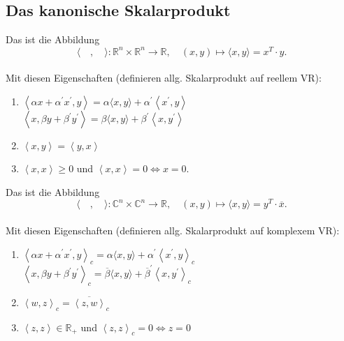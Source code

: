 \documentclass[8pt, a4paper, twocolumn, landscape]{article}
\begin{document}
\subsection{Das kanonische Skalarprodukt}
\begin{definition}
Das  ist die Abbildung $$\langle\quad, \quad\rangle: \mathbb{R}^{n} \times \mathbb{R}^{n} \rightarrow \mathbb{R}, \quad(x, y) \mapsto\langle x, y\rangle  =  x^T \cdot y.$$
\\Mit diesen Eigenschaften (definieren allg. Skalarprodukt auf reellem VR):
\begin{enumerate}
\item {} $\left\langle \alpha x+ \alpha^{\prime} x^{\prime}, y\right\rangle=\alpha \langle x, y\rangle+ \alpha^{\prime}\left\langle x^{\prime}, y\right\rangle $
\\$\left\langle x, \beta y+ \beta^{\prime} y^{\prime}\right\rangle=\beta \langle x, y\rangle+ \beta^{\prime}\left\langle x, y^{\prime}\right\rangle $
\item {} $\left\langle x, y \right\rangle = \left\langle y, x \right\rangle$
\item {} $\left\langle x, x \right\rangle \geq 0$ und $\left\langle x, x \right\rangle = 0 \Leftrightarrow x = 0$.
\end{enumerate}
\end{definition}

\begin{definition}
Das  ist die Abbildung $$\langle\quad, \quad\rangle: \mathbb{C}^{n} \times \mathbb{C}^{n} \rightarrow \mathbb{R}, \quad(x, y) \mapsto\langle x, y\rangle  = y^T \cdot \overline{x}.$$
\\Mit diesen Eigenschaften (definieren allg. Skalarprodukt auf komplexem VR):
\begin{enumerate}
\item {} $\left\langle \alpha x+ \alpha^{\prime} x^{\prime}, y\right\rangle_c=\alpha \langle x, y\rangle+ \alpha^{\prime}\left\langle x^{\prime}, y\right\rangle_c $
\\$\left\langle x, \beta y+ \beta^{\prime} y^{\prime}\right\rangle_c=\overline{\beta} \langle x, y\rangle+ \overline{\beta}^{\prime}\left\langle x, y^{\prime}\right\rangle_c $
\item {} $\left\langle w, z \right\rangle_c = \overline{\left\langle z, w \right\rangle}_c$
\item {} $\left\langle z, z \right\rangle \in \mathbb{R}_+$ und $\left\langle z, z\right\rangle_c = 0 \Leftrightarrow z = 0$
\end{enumerate}
\end{definition}
\end{document}
